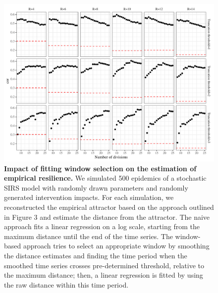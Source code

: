 \documentclass[12pt]{article}
\begin{document}
\pagebreak

\begin{figure}[!th]
\includegraphics[width=\textwidth]{../figure_analysis_random/figure_analysis_random.pdf}
\caption{
\textbf{Impact of fitting window selection on the estimation of empirical resilience.}
We simulated 500 epidemics of a stochastic SIRS model with randomly drawn parameters and randomly generated intervention impacts.
For each simulation, we reconstructed the empirical attractor based on the approach outlined in Figure 3 and estimate the distance from the attractor.
The naive approach fits a linear regression on a log scale, starting from the maximum distance until the end of the time series.
The window-based approach tries to select an appropriate window by smoothing the distance estimates and finding the time period when the smoothed time series crosses pre-determined threshold, relative to the maximum distance;
then, a linear regression is fitted by using the raw distance within this time period.
}
\end{figure}

\pagebreak
\end{document}
